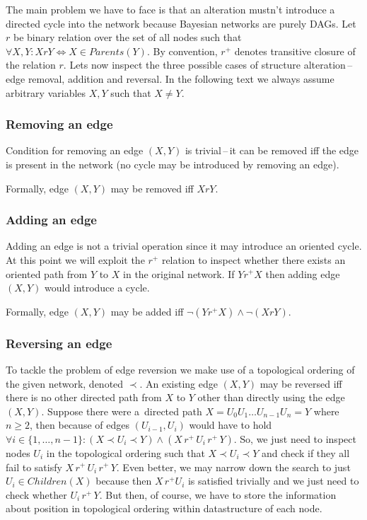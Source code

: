 \documentclass[english,cover]{fitthesis} %
\begin{document}
The main problem we have to face is that an alteration mustn't introduce a directed cycle into the network because Bayesian networks are purely DAGs. Let $r$ be binary relation over the set of all nodes such that $\forall X,Y: XrY \Leftrightarrow X \in Parents(Y)$. By convention, $r^+$ denotes transitive closure of the relation $r$. Lets now inspect the three possible cases of structure alteration\,--\,edge removal, addition and reversal. In the following text we always assume arbitrary variables $X,Y$ such that $X \neq Y$.


\subsubsection{Removing an edge}
Condition for removing an edge $(X,Y)$ is trivial\,--\,it can be removed iff the edge is present in the network (no cycle may be introduced by removing an edge).

Formally, edge $(X,Y)$ may be removed iff $XrY$.


\subsubsection{Adding an edge}
Adding an edge is not a trivial operation since it may introduce an oriented cycle. At this point we will exploit the $r^+$ relation to inspect whether there exists an oriented path from $Y$ to $X$ in the original network. If $Y r^+ X$ then adding edge $(X,Y)$ would introduce a cycle.

Formally, edge $(X,Y)$ may be added iff $\neg(Y r^+ X) \land \neg(X r Y)$.


\subsubsection{Reversing an edge}
To tackle the problem of edge reversion we make use of a topological ordering of the given network, denoted $\prec$. An existing edge $(X,Y)$ may be reversed iff there is no other directed path from $X$ to $Y$ other than directly using the edge $(X,Y)$. Suppose there were a~directed path $X = U_0 U_1 \dots U_{n-1} U_n = Y$ where $n \geq 2$, then because of edges $(U_{i-1}, U_i)$ would have to hold $\forall i \in \lbrace 1,\dots, n-1 \rbrace: (X \prec U_i \prec Y) \land (X \, r^+ \, U_i \, r^+ \, Y)$. So, we just need to inspect nodes $U_i$ in the topological ordering such that $X \prec U_i \prec Y$ and check if they all fail to satisfy $X \, r^+ \, U_i \, r^+ \, Y$. Even better, we may narrow down the search to just $U_i \in Children(X)$ because then $X \, r^+ U_i$ is satisfied trivially and we just need to check whether $U_i \, r^+ \, Y$. But then, of course, we have to store the information about position in topological ordering within datastructure of each node.
\end{document}
